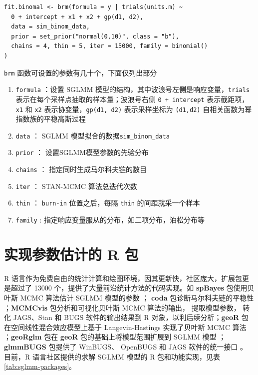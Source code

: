 \documentclass[12pt,a4paper,UTF8,twoside]{book}
\providecommand{\tightlist}{%
  \setlength{\itemsep}{0pt}\setlength{\parskip}{0pt}}
\theoremstyle{definition}
\theoremstyle{definition}
\theoremstyle{definition}
\theoremstyle{remark}
\begin{document}
\begin{verbatim}
fit.binomal <- brm(formula = y | trials(units.m) ~ 
  0 + intercept + x1 + x2 + gp(d1, d2), 
  data = sim_binom_data,
  prior = set_prior("normal(0,10)", class = "b"),
  chains = 4, thin = 5, iter = 15000, family = binomial()
)    
\end{verbatim}

\noindent \texttt{brm} 函数可设置的参数有几十个，下面仅列出部分

\begin{enumerate}
\def\labelenumi{\arabic{enumi}.}
\tightlist
\item
  \texttt{formula} ：设置 SGLMM
  模型的结构，其中波浪号左侧是响应变量，\texttt{trials}
  表示在每个采样点抽取的样本量；波浪号右侧 \texttt{0\ +\ intercept}
  表示截距项， \texttt{x1} 和 \texttt{x2}
  表示协变量，\texttt{gp(d1,\ d2)} 表示采样坐标为 \texttt{(d1,d2)}
  自相关函数为幂指数族的平稳高斯过程
\item
  \texttt{data} ： SGLMM 模型拟合的数据\texttt{sim\_binom\_data}
\item
  \texttt{prior} ： 设置SGLMM模型参数的先验分布
\item
  \texttt{chains} ： 指定同时生成马尔科夫链的数目
\item
  \texttt{iter} ： STAN-MCMC 算法总迭代次数
\item
  \texttt{thin} ： \texttt{burn-in} 位置之后，每隔 \texttt{thin}
  的间距就采一个样本
\item
  \texttt{family} : 指定响应变量服从的分布，如二项分布，泊松分布等
\end{enumerate}

\hypertarget{subsec:sglmm-with-r}{%
\section{实现参数估计的 R 包}\label{subsec:sglmm-with-r}}

R
语言作为免费自由的统计计算和绘图环境，因其更新快，社区庞大，扩展包更是超过了
13000 个，提供了大量前沿统计方法的代码实现。如 \textbf{spBayes}
包使用贝叶斯 MCMC 算法估计 SGLMM 模型的参数 \citep{spBayes2015}；
\textbf{coda} 包诊断马尔科夫链的平稳性
\citep{coda2006}；\textbf{MCMCvis} 包分析和可视化贝叶斯 MCMC
算法的输出， 提取模型参数， 转化 JAGS、Stan 和 BUGS 软件的输出结果到 R
对象，以利后续分析；\textbf{geoR} 包 在空间线性混合效应模型上基于
Langevin-Hastings 实现了贝叶斯 MCMC 算法
\citep{geoR2001}；\textbf{geoRglm} 包在 \textbf{geoR}
包的基础上将模型范围扩展到 SGLMM 模型
\citep{geoRglm2002}；\textbf{glmmBUGS} 包提供了 WinBUGS、 OpenBUGS 和
JAGS 软件的统一接口 \citep{glmmBUGS2010MCMC}。 目前，R
语言社区提供的求解 SGLMM 模型的 R 包和功能实现，见表
\ref{tab:sglmm-packages}。
\end{document}
